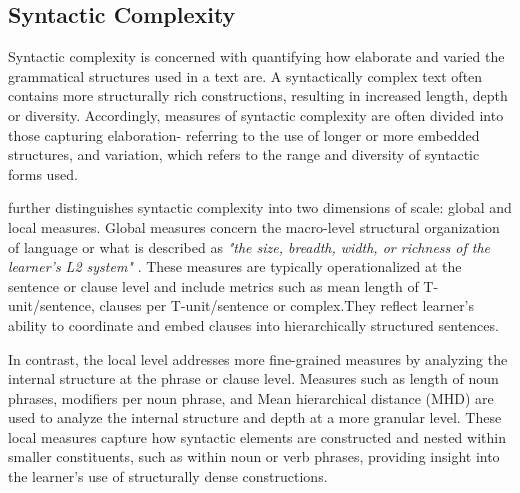 
\subsection{Syntactic Complexity}


Syntactic complexity  is concerned with quantifying how elaborate and varied the grammatical structures used in a
    text are. A syntactically complex text often contains more structurally rich constructions, resulting in increased length, depth or diversity. Accordingly, measures of syntactic complexity are often divided into those capturing elaboration- referring to the use of
    longer or more embedded structures, and variation, which refers to the range and diversity of syntactic forms
    used.

\citet{Butle2012} further distinguishes syntactic complexity into two dimensions of scale: global and local
measures. Global
measures concern the macro-level structural organization of language or what is described as
\textit{"the size, breadth, width, or richness of the
learner's L2 system"} \cite{Butle2012}. These measures are typically operationalized at the sentence or clause level
and include metrics such as mean length of T-unit/sentence, clauses per T-unit/sentence or complex.They reflect
learner's ability to coordinate and embed clauses into hierarchically structured sentences.

In contrast, the local level addresses more fine-grained measures by analyzing
the internal structure at the phrase or clause level. Measures such as length of noun phrases,
modifiers per noun phrase, and Mean hierarchical distance (MHD) are used to analyze the internal structure and depth
at a more granular level. These local measures capture how syntactic elements are constructed and nested within
smaller constituents, such as within noun or verb phrases, providing insight into the learner's use of structurally
dense constructions.

